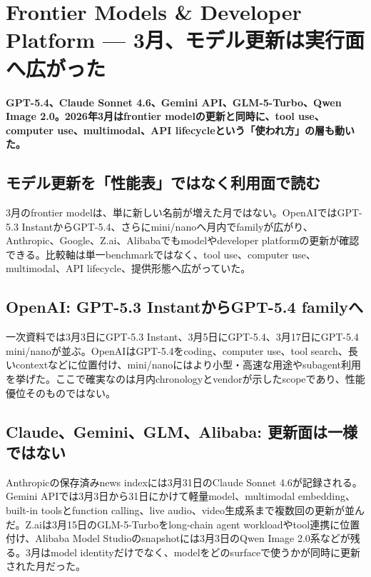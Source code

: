 \section{Frontier Models \& Developer Platform — 3月、モデル更新は実行面へ広がった}
\noindent\textbf{GPT-5.4、Claude Sonnet 4.6、Gemini API、GLM-5-Turbo、Qwen Image 2.0。2026年3月はfrontier modelの更新と同時に、tool use、computer use、multimodal、API lifecycleという「使われ方」の層も動いた。}\autocite{src-9156c37fb1c2,src-a24fd97eb3d0,src-eac8dfbeb78c,src-eea6230f612a,src-f6aa679babd7}

\subsection{モデル更新を「性能表」ではなく利用面で読む}

3月のfrontier modelは、単に新しい名前が増えた月ではない。OpenAIではGPT-5.3 InstantからGPT-5.4、さらにmini/nanoへ月内でfamilyが広がり、Anthropic、Google、Z.ai、Alibabaでもmodelやdeveloper platformの更新が確認できる。比較軸は単一benchmarkではなく、tool use、computer use、multimodal、API lifecycle、提供形態へ広がっていた。\autocite{src-46b3e364b737,src-8afdb503cc56,src-9156c37fb1c2,src-a24fd97eb3d0,src-eac8dfbeb78c,src-eea6230f612a,src-f6aa679babd7}


\subsection{OpenAI: GPT-5.3 InstantからGPT-5.4 familyへ}

一次資料では3月3日にGPT-5.3 Instant、3月5日にGPT-5.4、3月17日にGPT-5.4 mini/nanoが並ぶ。OpenAIはGPT-5.4をcoding、computer use、tool search、長いcontextなどに位置付け、mini/nanoにはより小型・高速な用途やsubagent利用を挙げた。ここで確実なのは月内chronologyとvendorが示したscopeであり、性能優位そのものではない。\autocite{src-46b3e364b737,src-8afdb503cc56,src-eea6230f612a}


\subsection{Claude、Gemini、GLM、Alibaba: 更新面は一様ではない}

Anthropicの保存済みnews indexには3月31日のClaude Sonnet 4.6が記録される。Gemini APIでは3月3日から31日にかけて軽量model、multimodal embedding、built-in toolsとfunction calling、live audio、video生成系まで複数回の更新が並んだ。Z.aiは3月15日のGLM-5-Turboをlong-chain agent workloadやtool連携に位置付け、Alibaba Model Studioのsnapshotには3月3日のQwen Image 2.0系などが残る。3月はmodel identityだけでなく、modelをどのsurfaceで使うかが同時に更新された月だった。\autocite{src-9156c37fb1c2,src-a24fd97eb3d0,src-eac8dfbeb78c,src-f6aa679babd7}


